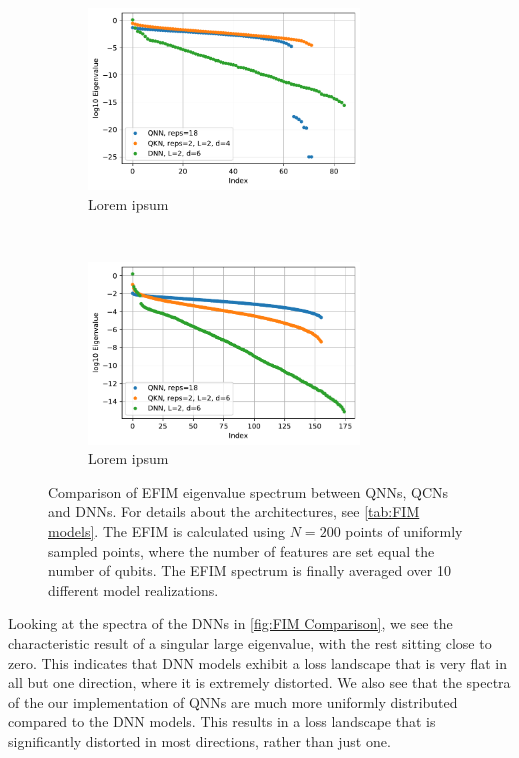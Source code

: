 \begin{figure}[H]
    \centering
    \begin{subfigure}[t]{0.5\textwidth}
        \centering
        \includegraphics[height=1.9in]{latex/figures/FIM_qubits_4.pdf}
        \caption{Lorem ipsum}
        
    \end{subfigure}%
    ~ 
    \begin{subfigure}[t]{0.5\textwidth}
        \centering
        \includegraphics[height=1.9in]{latex/figures/FIM_qubits_6.pdf}
        \caption{Lorem ipsum}
    \end{subfigure}
    \caption{Comparison of EFIM eigenvalue spectrum between QNNs, QCNs and DNNs. For details about the architectures, see \autoref{tab:FIM models}. The EFIM is calculated using $N=200$ points of uniformly sampled points, where the number of features are set equal the number of qubits. The EFIM spectrum is finally averaged over 10 different model realizations.}
    \label{fig:FIM Comparison}
\end{figure}

Looking at the spectra of the DNNs in \autoref{fig:FIM Comparison}, we see the characteristic result of a singular large eigenvalue, with the rest sitting close to zero. This indicates that DNN models exhibit a loss landscape that is very flat in all but one direction, where it is extremely distorted. We also see that the spectra of the our implementation of QNNs are much more uniformly distributed compared to the DNN models. This results in a loss landscape that is significantly distorted in most directions, rather than just one. 

